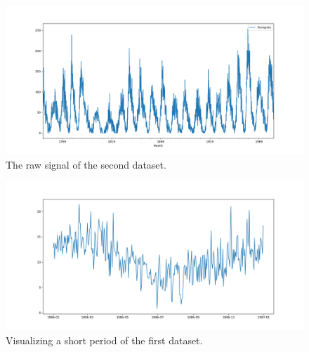 \begin{figure}[H]
    \centering
    \begin{minipage}[b]{1\textwidth}
        \includegraphics[width=\textwidth]{figures/Ass1/Ass1_D2_raw_signal.png}
    \end{minipage}
    \caption{The raw signal of the second dataset.}
    \label{fig:Ass1_D2_raw_signal}
\end{figure}

\begin{figure}[H]
    \centering
    \begin{minipage}[b]{1\textwidth}
        \includegraphics[width=\textwidth]{figures/Ass1/Ass1_D1_raw_signal_1986.png}
    \end{minipage}
    \caption{Visualizing a short period of the first dataset.}
    \label{fig:Ass1_D1_raw_signal_1986}
\end{figure}


